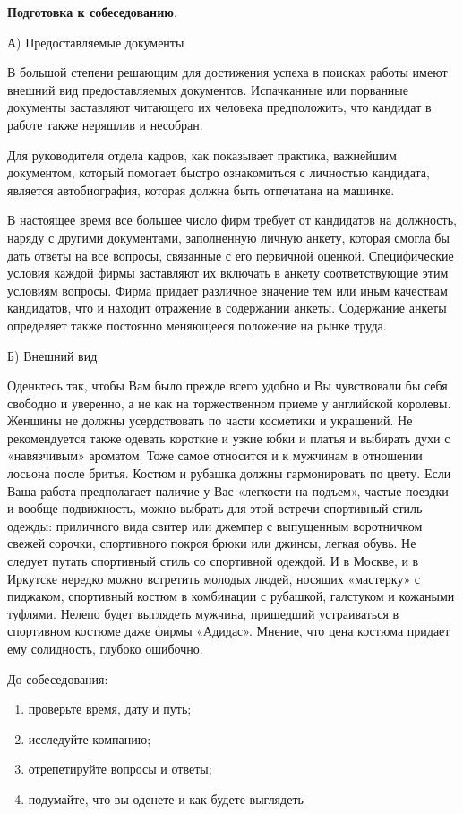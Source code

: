 \textbf{Подготовка к собеседованию}.

А) Предоставляемые документы

В большой степени решающим для достижения успеха в поисках работы имеют внешний вид предоставляемых документов. Испачканные или порванные документы заставляют читающего их человека предположить, что кандидат в работе также неряшлив и несобран.

Для руководителя отдела кадров, как показывает практика, важнейшим документом, который помогает быстро ознакомиться с личностью кандидата, является автобиография, которая должна быть отпечатана на машинке.

В настоящее время все большее число фирм требует от кандидатов на должность, наряду с другими документами, заполненную личную анкету, которая смогла бы дать ответы на все вопросы, связанные с его первичной оценкой. Специфические условия каждой фирмы заставляют их включать в анкету соответствующие этим условиям вопросы. Фирма придает различное значение тем или иным качествам кандидатов, что и находит отражение в содержании анкеты. Содержание анкеты определяет также постоянно меняющееся положение на рынке труда.

Б) Внешний вид

Оденьтесь так, чтобы Вам было прежде всего удобно и Вы чувствовали бы себя свободно и уверенно, а не как на торжественном приеме у английской королевы. Женщины не должны усердствовать по части косметики и украшений. Не рекомендуется также одевать короткие и узкие юбки и платья и выбирать духи с «навязчивым» ароматом. Тоже самое относится и к мужчинам в отношении лосьона после бритья. Костюм и рубашка должны гармонировать по цвету. Если Ваша работа предполагает наличие у Вас «легкости на подъем», частые поездки и вообще подвижность, можно выбрать для этой встречи спортивный стиль одежды: приличного вида свитер или джемпер с выпущенным воротничком свежей сорочки, спортивного покроя брюки или джинсы, легкая обувь. Не следует путать спортивный стиль со спортивной одеждой. И в Москве, и в Иркутске нередко можно встретить молодых людей, носящих «мастерку» с пиджаком, спортивный костюм в комбинации с рубашкой, галстуком и кожаными туфлями. Нелепо будет выглядеть мужчина, пришедший устраиваться в спортивном костюме даже фирмы «Адидас». Мнение, что цена костюма придает ему солидность, глубоко ошибочно.

До собеседования:
\begin{enumerate}[noitemsep]
    \item проверьте время, дату и путь;
    \item исследуйте компанию;
    \item отрепетируйте вопросы и ответы;
    \item подумайте, что вы оденете и как будете выглядеть
\end{enumerate}



